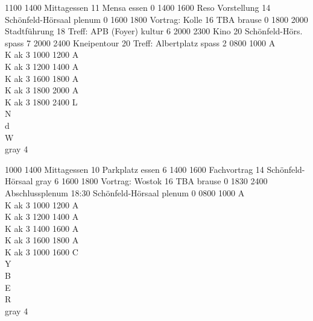 \documentclass[a5paper,9pt]{scrreprt}
\begin{document}
\begin{center}
\begin{timetable}
   {1100} {1400} {Mittagessen}      {11} {Mensa}        {} {essen}   {0}
   {1400} {1600} {Reso Vorstellung} {14} {Schönfeld-Hörsaal}               {} {plenum}  {0}
   {1600} {1800} {Vortrag: Kolle}   {16} {TBA}               {} {brause}  {0}
   {1800} {2000} {Stadtführung}     {18} {Treff: APB (Foyer)}    {} {kultur} {6}
   {2000} {2300} {Kino}             {20} {Schönfeld-Hörs.}         {} {spass}   {7}
   {2000} {2400} {Kneipentour}      {20} {Treff: Albertplatz}    {} {spass}   {2}
   {0800} {1000} {\hfill A\\ \hfill K} {} {}               {} {ak}      {3}
   {1000} {1200} {\hfill A\\ \hfill K} {} {}               {} {ak}      {3}
   {1200} {1400} {\hfill A\\ \hfill K} {} {}               {} {ak}      {3}
   {1600} {1800} {\hfill A\\ \hfill K} {} {}               {} {ak}      {3}
   {1800} {2000} {\hfill A\\ \hfill K} {} {}               {} {ak}      {3}
   {1800} {2400} {L\\ N\\ d\\ W\\}       {} {}               {} {gray} {4}

   {1000} {1400} {Mittagessen}      {10} {Parkplatz}  {} {essen}   {6}
   {1400} {1600} {Fachvortrag}      {14} {Schönfeld-Hörsaal}  {} {gray}   {6}
   {1600} {1800} {Vortrag: Wostok}  {16} {TBA}               {} {brause}  {0}
   {1830} {2400} {Abschlussplenum}  {18:30} {Schönfeld-Hörsaal} {} {plenum}  {0}
   {0800} {1000} {\hfill A\\ \hfill K} {} {}               {} {ak}      {3}
   {1000} {1200} {\hfill A\\ \hfill K} {} {}               {} {ak}      {3}
   {1200} {1400} {\hfill A\\ \hfill K} {} {}               {} {ak}      {3}
   {1400} {1600} {\hfill A\\ \hfill K} {} {}               {} {ak}      {3}
   {1600} {1800} {\hfill A\\ \hfill K} {} {}               {} {ak}      {3}
   {1000} {1600} {C\\ Y\\ B\\ E\\ R\\}       {} {}               {}
  {gray} {4}
\end{timetable}
\end{center}
\end{document}
